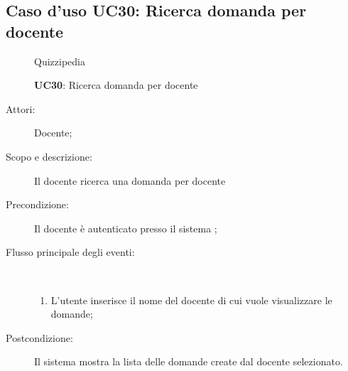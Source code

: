 \subsection{Caso d'uso UC30: Ricerca domanda per docente}
	\begin{figure}[H]
		\centering
		\begin{resizedtikzpicture}{\textwidth}
		\begin{umlsystem}[x=0, fill=lightgray!20]{Quizzipedia}
		\end{umlsystem}
		\end{resizedtikzpicture}
		\caption{\textbf{UC30}: Ricerca domanda per docente}
		\label{UC30}
	\end{figure}
\begin{description}
\item[Attori:] Docente;
\item[Scopo e descrizione:] Il docente ricerca una domanda per docente
      \item[Precondizione:] Il docente è autenticato presso il sistema
;

        \item[Flusso principale degli eventi:] \ 
 \begin{enumerate}
          \item L'utente inserisce il nome del docente di cui vuole visualizzare le domande;

      \end{enumerate}
    \item[Postcondizione:] Il sistema mostra la lista delle domande create dal docente selezionato.
  \end{description}
\hypertarget{UC31}{}

